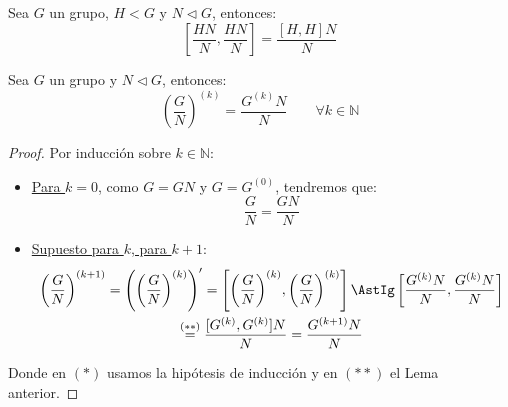 \begin{lema}
    Sea $G$ un grupo, $H<G$ y $N\lhd G$, entonces:
    \begin{equation*}
        \left[\dfrac{HN}{N}, \dfrac{HN}{N}\right] = \dfrac{[H,H]N}{N}
    \end{equation*} %
\end{lema}

\begin{lema}
    Sea $G$ un grupo y $N\lhd G$, entonces:
    \begin{equation*}
        {\left(\dfrac{G}{N}\right)}^{(k)} = \dfrac{G^{(k)}N}{N} \qquad \forall k\in \mathbb{N}
    \end{equation*}
    \begin{proof}
        Por inducción sobre $k\in \mathbb{N}$:
        \begin{itemize}
            \item \underline{Para $k=0$}, como $G=GN$ y $G=G^{(0)}$, tendremos que:
                \begin{equation*}
                    \dfrac{G}{N} = \dfrac{GN}{N}
                \end{equation*}
            \item \underline{Supuesto para $k$, para $k+1$}:
            \begin{multline*}
                {\left(\dfrac{G}{N}\right)}^{(k+1)} = \left({\left(\dfrac{G}{N}\right)}^{(k)}\right)' = \left[{\left(\dfrac{G}{N}\right)}^{(k)}, {\left(\dfrac{G}{N}\right)}^{(k)}\right] \AstIg \left[\dfrac{G^{(k)}N}{N}, \dfrac{G^{(k)}N}{N}\right] \\ \stackrel{(\ast\ast)}{=}  \dfrac{[G^{(k)}, G^{(k)}]N}{N} = \dfrac{G^{(k+1)}N}{N}
            \end{multline*}
        \end{itemize}
        Donde en $(\ast)$ usamos la hipótesis de inducción y en $(\ast\ast)$ el Lema anterior.
    \end{proof}
\end{lema}

